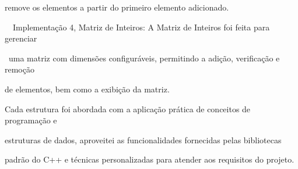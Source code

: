 \documentclass{article}
\begin{document}
remove os elementos a partir do primeiro elemento adicionado. 

\ \ Implementa\c{c}\~ao 4, Matriz de Inteiros: A Matriz de Inteiros foi feita para gerenciar

\ uma matriz com dimens\~oes configur\'aveis, permitindo a adi\c{c}\~ao, verifica\c{c}\~ao e remo\c{c}\~ao 

de elementos, bem como a exibi\c{c}\~ao da matriz.

Cada estrutura foi abordada com a aplica\c{c}\~ao pr\'atica de conceitos de programa\c{c}\~ao e 

estruturas de dados, aproveitei as funcionalidades fornecidas pelas bibliotecas 

padr\~ao do C++ e t\'ecnicas personalizadas para atender aos requisitos do projeto.
\end{document}
